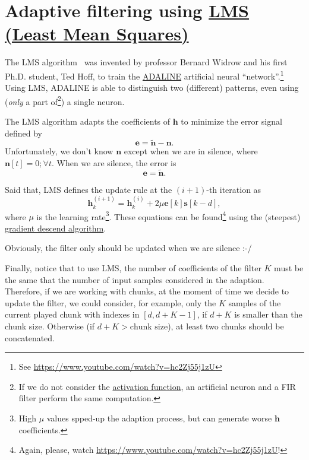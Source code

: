 \section{Adaptive filtering using  \href{https://en.wikipedia.org/wiki/Least_mean_squares_filter}{LMS (Least Mean Squares)}}

The LMS algorithm~\cite{haykin1995adaptive,boyd2004convex} was
invented by professor Bernard Widrow and his first Ph.D. student, Ted
Hoff, to train the
\href{https://en.wikipedia.org/wiki/ADALINE}{ADALINE} artificial
neural ``network''.\footnote{See
  \url{https://www.youtube.com/watch?v=hc2Zj55j1zU}} Using LMS,
ADALINE is able to distinguish two (different) patterns, even using
(\emph{only} a part of\footnote{If we do not consider the
  \href{https://en.wikipedia.org/wiki/Activation_function}{activation
    function}, an artificial neuron and a FIR filter perform the same
  computation.}) a single neuron.

The LMS algorithm adapts the coefficients of $\mathbf{h}$ to minimize
the error signal defined by
\begin{equation}
  \mathbf{e} = \tilde{\mathbf{n}} - \mathbf{n}.
\end{equation}
Unfortunately, we don't know $\mathbf{n}$ except when we are in
silence, where $\mathbf{n}[t]=0;\forall t$. When we are silence,
the error is
\begin{equation}
  \mathbf{e} = \tilde{\mathbf{n}}.
\end{equation}

Said that, LMS defines the update rule at the $(i+1)$-th iteration as
\begin{equation}
  \mathbf{h}^{(i+1)}_k = \mathbf{h}^{(i)}_k + 2\mu\mathbf{e}[k]\mathbf{s}[k-d],
  \label{eq:update}
\end{equation}
where $\mu$ is the learning
rate\footnote{High $\mu$ values spped-up the adaption process, but can
generate worse $\mathbf{h}$ coefficients.}.  These equations can be
found\footnote{Again, please, watch
\url{https://www.youtube.com/watch?v=hc2Zj55j1zU}!} using the
(steepest)
\href{https://en.wikipedia.org/wiki/Gradient_descent}{gradient descend
  algorithm}.

Obviously, the filter only should be updated when we are silence :-/

Finally, notice that to use LMS, the number of coefficients of the
filter $K$ must be the same that the number of input samples
considered in the adaption. Therefore, if we are working with chunks,
at the moment of time we decide to update the filter, we could
consider, for example, only the $K$ samples of the current played
chunk with indexes in $[d, d+K-1]$, if $d+K$ is smaller than the
chunk size. Otherwise (if $d+K > \text{chunk~size}$), at least two
chunks should be concatenated.

